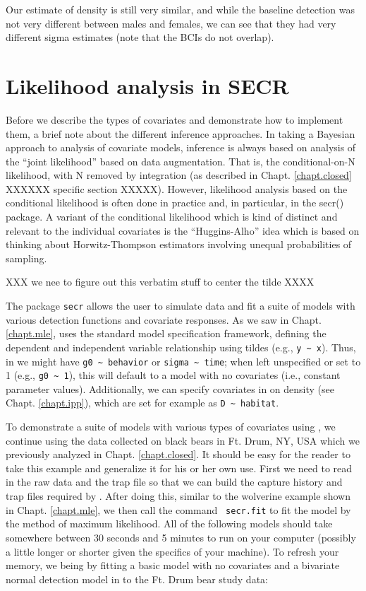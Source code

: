 Our estimate of density is still very similar, and while the baseline detection was not very different
between males and females, we can see that they had very different sigma estimates (note that the BCIs do not
overlap).  




\section{Likelihood analysis in SECR}

Before we describe the types of covariates and demonstrate how to
implement them, a brief note about the different inference approaches.
In taking a Bayesian approach to analysis of covariate models,
inference is always based on analysis of the ``joint likelihood''
based on data augmentation. That is, the conditional-on-N likelihood,
with N removed by integration (as described in
Chapt. \ref{chapt.closed} XXXXXX specific section XXXXX).
However, likelihood analysis
based on the conditional likelihood is often done in practice and, in
particular, in the secr() package.  A variant of the conditional
likelihood which is kind of distinct and relevant to the individual
covariates is the ``Huggins-Alho'' idea which is based on thinking
about Horwitz-Thompson estimators involving unequal probabilities of
sampling.



XXX we nee to figure out this verbatim stuff to center the tilde XXXX

The package \mbox{\tt secr} allows the user to simulate data and fit a
suite of models with various detection functions and covariate
responses.  As we saw in Chapt. \ref{chapt.mle}, \secr uses the standard \R model
specification framework, defining the dependent and independent
variable relationship using tildes
(e.g., \Verb+y ~ x+).
Thus, in \secr we
might have \verb+g0 ~ behavior+ or \verb+sigma ~ time+;
when left unspecified or set
to 1 (e.g., \verb+g0 ~ 1+), this will default to a model with no
covariates
(i.e., constant parameter values).
Additionally, we can specify covariates in \secr
on density (see Chapt. \ref{chapt.ipp}),
which are set for example as \verb+D ~ habitat+.

To demonstrate
a suite of models with various types of covariates using \secr, we
continue using the data collected on black bears in Ft. Drum, NY, USA
which we previously analyzed in Chapt. \ref{chapt.closed}.
It should be easy for the reader to take this example and generalize
it for his or her own use.  First we need to read in the raw data and
the trap file so that we can build the capture history and trap files
required by \secr.  After doing this, similar to the wolverine example
shown in Chapt. \ref{chapt.mle}, we then call the command \mbox{\tt
  secr.fit}
to fit the model by the method of maximum likelihood.
 All of the following models should take somewhere between 30
seconds and 5 minutes to run on your computer (possibly a little
longer or shorter given the specifics of your machine).  To refresh
your memory, we being by fitting a basic
model with no covariates and a bivariate normal detection model in
\secr to the Ft. Drum bear study data:

